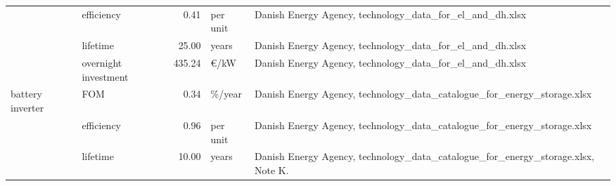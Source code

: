 \begin{longtable}{p{4cm}p{4cm}rp{3cm}p{10cm}}
                      & efficiency &         0.41 &                      per unit &                                                                                                                                                                                                                                                                        Danish Energy Agency, technology\_data\_for\_el\_and\_dh.xlsx \\
                      & lifetime &        25.00 &                         years &                                                                                                                                                                                                                                                                        Danish Energy Agency, technology\_data\_for\_el\_and\_dh.xlsx \\
                      & overnight investment &       435.24 &                      \euro/kW &                                                                                                                                                                                                                                                                        Danish Energy Agency, technology\_data\_for\_el\_and\_dh.xlsx \\
battery inverter & FOM &         0.34 &                       \%/year &                                                                                                                                                                                                                                                         Danish Energy Agency, technology\_data\_catalogue\_for\_energy\_storage.xlsx \\
                      & efficiency &         0.96 &                      per unit &                                                                                                                                                                                                                                                         Danish Energy Agency, technology\_data\_catalogue\_for\_energy\_storage.xlsx \\
                      & lifetime &        10.00 &                         years &                                                                                                                                                                                                                                                Danish Energy Agency, technology\_data\_catalogue\_for\_energy\_storage.xlsx, Note K. \\

\end{longtable}
